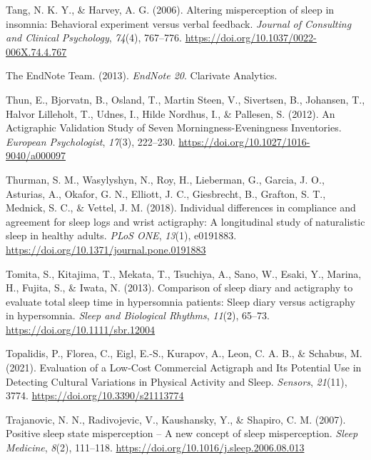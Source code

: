 \documentclass[
]{article}
\newlength{\cslhangindent}
\newenvironment{CSLReferences}[2] %
 {\begin{list}{}{%
  \setlength{\itemindent}{0pt}
  \setlength{\leftmargin}{0pt}
  \setlength{\parsep}{0pt}
  \ifodd #1
   \setlength{\leftmargin}{\cslhangindent}
   \setlength{\itemindent}{-1\cslhangindent}
  \fi
  \setlength{\itemsep}{#2\baselineskip}}}
 {\end{list}}
\begin{document}
\begin{CSLReferences}{1}{0}
Tang, N. K. Y., \& Harvey, A. G. (2006). Altering misperception of sleep in insomnia: {Behavioral} experiment versus verbal feedback. \emph{Journal of Consulting and Clinical Psychology}, \emph{74}(4), 767--776. \url{https://doi.org/10.1037/0022-006X.74.4.767}

The EndNote Team. (2013). \emph{EndNote 20}. Clarivate Analytics.

Thun, E., Bjorvatn, B., Osland, T., Martin Steen, V., Sivertsen, B., Johansen, T., Halvor Lilleholt, T., Udnes, I., Hilde Nordhus, I., \& Pallesen, S. (2012). An {Actigraphic} {Validation} {Study} of {Seven} {Morningness}-{Eveningness} {Inventories}. \emph{European Psychologist}, \emph{17}(3), 222--230. \url{https://doi.org/10.1027/1016-9040/a000097}

Thurman, S. M., Wasylyshyn, N., Roy, H., Lieberman, G., Garcia, J. O., Asturias, A., Okafor, G. N., Elliott, J. C., Giesbrecht, B., Grafton, S. T., Mednick, S. C., \& Vettel, J. M. (2018). Individual differences in compliance and agreement for sleep logs and wrist actigraphy: {A} longitudinal study of naturalistic sleep in healthy adults. \emph{PLoS ONE}, \emph{13}(1), e0191883. \url{https://doi.org/10.1371/journal.pone.0191883}

Tomita, S., Kitajima, T., Mekata, T., Tsuchiya, A., Sano, W., Esaki, Y., Marina, H., Fujita, S., \& Iwata, N. (2013). Comparison of sleep diary and actigraphy to evaluate total sleep time in hypersomnia patients: {Sleep} diary versus actigraphy in hypersomnia. \emph{Sleep and Biological Rhythms}, \emph{11}(2), 65--73. \url{https://doi.org/10.1111/sbr.12004}

Topalidis, P., Florea, C., Eigl, E.-S., Kurapov, A., Leon, C. A. B., \& Schabus, M. (2021). Evaluation of a {Low}-{Cost} {Commercial} {Actigraph} and {Its} {Potential} {Use} in {Detecting} {Cultural} {Variations} in {Physical} {Activity} and {Sleep}. \emph{Sensors}, \emph{21}(11), 3774. \url{https://doi.org/10.3390/s21113774}

Trajanovic, N. N., Radivojevic, V., Kaushansky, Y., \& Shapiro, C. M. (2007). Positive sleep state misperception -- {A} new concept of sleep misperception. \emph{Sleep Medicine}, \emph{8}(2), 111--118. \url{https://doi.org/10.1016/j.sleep.2006.08.013}


\end{CSLReferences}
\end{document}
